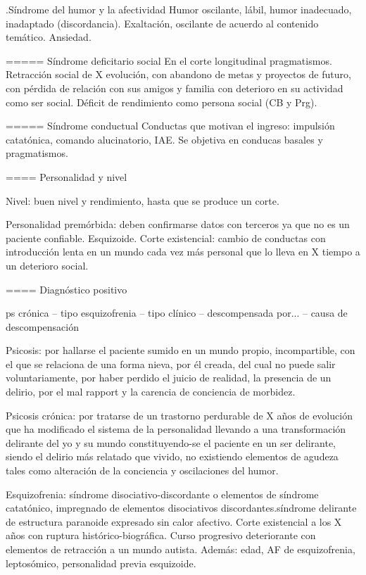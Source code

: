 .Síndrome del humor y la afectividad
Humor oscilante, lábil, humor inadecuado, inadaptado (discordancia). Exaltación, oscilante de acuerdo al contenido temático. Ansiedad.

===== Síndrome deficitario social
En el corte longitudinal pragmatismos. Retracción social de X evolución, con abandono de metas y proyectos de futuro, con pérdida de relación con sus amigos y familia con deterioro en su actividad como ser social. Déficit de rendimiento como persona social (CB y Prg).

===== Síndrome conductual
Conductas que motivan el ingreso: impulsión catatónica, comando alucinatorio, IAE. Se objetiva en conducas basales y pragmatismos.

==== Personalidad y nivel

Nivel: buen nivel y rendimiento, hasta que se produce un corte.

Personalidad premórbida: deben confirmarse datos con terceros ya que no es un paciente confiable. Esquizoide. Corte existencial: cambio de conductas con introducción lenta en un mundo cada vez más personal que lo lleva en X tiempo a un deterioro social.

==== Diagnóstico positivo

ps crónica – tipo esquizofrenia – tipo clínico – descompensada por... – causa de descompensación

Psicosis: por hallarse el paciente sumido en un mundo propio, incompartible, con el que se relaciona de una forma nieva, por él creada, del cual no puede salir voluntariamente, por haber perdido el juicio de realidad, la presencia de un delirio, por el mal rapport y la carencia de conciencia de morbidez.

Psicosis crónica: por tratarse de un trastorno perdurable de X años de evolución que ha modificado el sistema de la personalidad llevando a una transformación delirante del yo y su mundo constituyendo-se el paciente en un ser delirante, siendo el delirio más relatado que vivido, no existiendo elementos de agudeza tales como alteración de la conciencia y oscilaciones del humor.

Esquizofrenia: síndrome disociativo-discordante o elementos de síndrome catatónico, impregnado de elementos disociativos discordantes.síndrome delirante de estructura paranoide expresado sin calor afectivo. Corte existencial a los X años con ruptura histórico-biográfica. Curso progresivo deteriorante con elementos de retracción a un mundo autista. Además: edad, AF de esquizofrenia, leptosómico, personalidad previa esquizoide.

